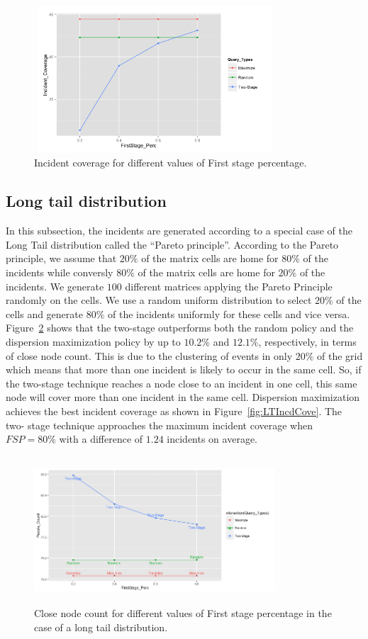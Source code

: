 \documentclass{acm_proc_article-sp}
\begin{document}
\begin{figure}[!h]
\centering
\includegraphics[width=9cm ,height=5.5cm]{figuresPng/Uni-Inc_Coverage.png}
\caption{Incident coverage for different values of First stage percentage. }
\label{fig:uniIncdCove}
\end{figure}
\subsection{Long tail distribution}
In this subsection, the incidents are generated according to a special case of the Long Tail distribution called the ``Pareto principle''. According to the Pareto principle, we assume that $20\%$ of the matrix cells are home for $80\%$ of the incidents while conversly $80\%$ of the matrix cells are home for $20\%$ of the incidents. We generate $100$ different matrices applying the Pareto Principle randomly on the cells. We use a random uniform distribution to select $20\%$ of the cells and generate $80\%$ of the incidents uniformly for these cells and vice versa. Figure~\ref{fig:LTClosePeople} shows that the two-stage outperforms both the random policy and the dispersion maximization policy by up to $10.2\%$ and $12.1\%$, respectively, in terms of close node count. This is due to the clustering of events in only $20\%$ of the grid which means that more than one incident is likely to occur in the same cell. So, if the two-stage technique reaches a node close to an incident in one cell, this same node will cover more than one incident in the same cell. Dispersion maximization achieves the best incident coverage as shown in Figure~\ref{fig:LTIncdCove}. The two- stage technique approaches the maximum incident coverage when $FSP = 80\%$ with a difference of $1.24$ incidents on average.
\begin{figure}[!h]
\centering
\includegraphics[width=9cm ,height=5.5cm]{figuresPng/LT-closePeople.png}
\caption{Close node count for different values of First stage percentage in the case of a long tail distribution. }
\label{fig:LTClosePeople}
\end{figure}
\end{document}
